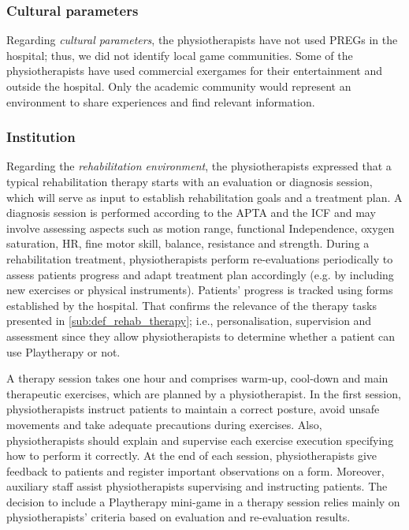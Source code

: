 \subsubsection{Cultural parameters}
Regarding \emph{cultural parameters}, the physiotherapists have not used \acp{PREG} in the hospital; thus, we did not identify local game communities. Some of the physiotherapists have used commercial exergames for their entertainment and outside the hospital. Only the academic community would represent an environment to share experiences and find relevant information. 

\subsubsection{Institution}
Regarding the \emph{rehabilitation environment}, the physiotherapists expressed that a typical rehabilitation therapy starts with an evaluation or diagnosis session, which will serve as input to establish rehabilitation goals and a treatment plan. A diagnosis session is performed according to the \ac{APTA} and the \ac{ICF} and may involve assessing aspects such as motion range, functional Independence, oxygen saturation, \ac{HR}, fine motor skill, balance, resistance and strength. During a rehabilitation treatment, physiotherapists perform re-evaluations periodically to assess patients progress and adapt treatment plan accordingly (e.g. by including new exercises or physical instruments). Patients' progress is tracked using forms established by the hospital. That confirms the relevance of the therapy tasks presented in \autoref{sub:def_rehab_therapy}; i.e., personalisation, supervision and assessment since they allow physiotherapists to determine whether a patient can use Playtherapy or not.

A therapy session takes one hour and comprises warm-up, cool-down and main therapeutic exercises, which are planned by a physiotherapist. In the first session, physiotherapists instruct patients to maintain a correct posture, avoid unsafe movements and take adequate precautions during exercises. Also, physiotherapists should explain and supervise each exercise execution specifying how to perform it correctly. At the end of each session, physiotherapists give feedback to patients and register important observations on a form. Moreover, auxiliary staff assist physiotherapists supervising and instructing patients. The decision to include a Playtherapy mini-game in a therapy session relies mainly on physiotherapists' criteria based on evaluation and re-evaluation results.


